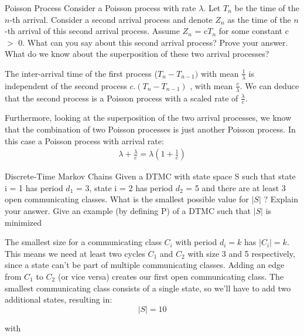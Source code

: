 \begin{problem}{Poisson Process}
Consider a Poisson process with rate $\lambda$. Let $T_n$ be the time of the $n$-th arrival. Consider a second arrival process and denote $Z_n$ as the time of the $n$-th arrival of this second arrival process. Assume $Z_n$ = c$T_n$ for some constant c $>$ 0. What can you say about this second arrival process? Prove your answer. What do we know about the superposition of these two arrival processes?
\end{problem}

\begin{solution} 
The inter-arrival time of the first process ($T_n - T_{n-1})$ with mean $\frac{1}{\lambda}$ is independent of the second process $ c.(T_n - T_{n-1})$ , with mean $\frac{c}{\lambda}$. We can deduce that the second process is a Poisson process with a scaled rate of $\frac{\lambda}{c}$. 

Furthermore, looking at the superposition of the two arrival processes, we know that the combination of two Poisson processes is just another Poisson process. In this case a Poisson process with arrival rate:
\begin{align*}
    \lambda +\frac{\lambda}{c}= \lambda\left (1+\frac{1}{c}  \right )
\end{align*}
\end{solution}


\begin{problem}{Discrete-Time Markov Chains}
Given a DTMC with state space S such that state i = 1 has period $d_1$ = 3, state i = 2 has period $d_2$ = 5 and there are at least 3 open communicating classes. What is the smallest possible value for $| S |$  ? Explain your answer. Give an example (by defining P) of a DTMC such that $| S |$ is minimized
\end{problem}

\begin{solution}
  The smallest size for a communicating class $C_i$ with period $d_i=k$ has $|C_i|=k$. This means we need at least two cycles $C_1$ and $C_2$ with size 3 and 5 respectively, since a state can't be part of multiple communicating classes. Adding an edge from $C_1$ to $C_2$ (or vice versa) creates our first open communicating class. The smallest communicating class consists of a single state, so we'll have to add two additional states, resulting in:
  \[
  \boxed{| S | = 10}
  \]
\end{solution}

with 

